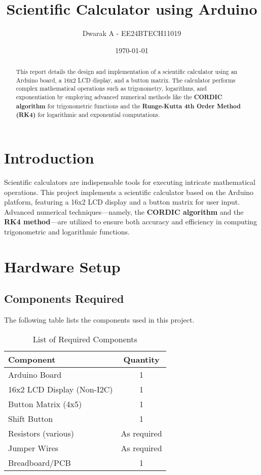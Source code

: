 \documentclass[a4paper,12pt]{article}
\title{Scientific Calculator using Arduino}
\author{Dwarak A - EE24BTECH11019}
\date{\today}
\begin{document}
\maketitle

\begin{abstract}
This report details the design and implementation of a scientific calculator using an Arduino board, a 16x2 LCD display, and a button matrix. The calculator performs complex mathematical operations such as trigonometry, logarithms, and exponentiation by employing advanced numerical methods like the \textbf{CORDIC algorithm} for trigonometric functions and the \textbf{Runge-Kutta 4th Order Method (RK4)} for logarithmic and exponential computations.
\end{abstract}

\newpage
\tableofcontents
\newpage

\section{Introduction}
Scientific calculators are indispensable tools for executing intricate mathematical operations. This project implements a scientific calculator based on the Arduino platform, featuring a 16x2 LCD display and a button matrix for user input. Advanced numerical techniques—namely, the \textbf{CORDIC algorithm} and the \textbf{RK4 method}—are utilized to ensure both accuracy and efficiency in computing trigonometric and logarithmic functions.

\section{Hardware Setup}
\subsection{Components Required}
The following table lists the components used in this project.

\begin{table}[H]
    \centering
    \renewcommand{\arraystretch}{1.2}
    \begin{tabular}{|l|c|}
        \hline
        \textbf{Component} & \textbf{Quantity} \\
        \hline
        Arduino Board & 1 \\
        16x2 LCD Display (Non-I2C) & 1 \\
        Button Matrix (4x5) & 1 \\
        Shift Button & 1 \\
        Resistors (various) & As required \\
        Jumper Wires & As required \\
        Breadboard/PCB & 1 \\
        \hline
    \end{tabular}
    \caption{List of Required Components}
    \label{tab:components}
\end{table}
\end{document}
